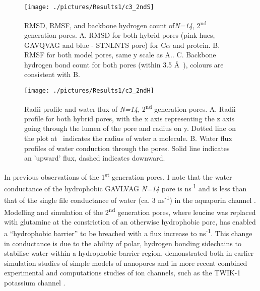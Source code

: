 \begin{figure}[H]
\begin{center}
\texttt{[image: ./pictures/Results1/c3\_2ndS]}
\caption[RMSD, RMSF, and backbone hydrogen count of\textit{N=14}, 2\textsuperscript{nd} generation pores.] {RMSD, RMSF, and backbone hydrogen count of\textit{N=14}, 2\textsuperscript{nd} generation pores. A. RMSD for both hybrid pores (pink hues, GAVQVAG and blue - STNLNTS pore) for C$\alpha$ and protein. B. RMSF for both model pores, same y scale as A.. C. Backbone hydrogen bond count for both pores (within 3.5 \AA\ ), colours are consistent with B.}
\label{fig:c3_2ndS}
\end{center}
\end{figure}

\begin{figure}[H]
\begin{center}
\texttt{[image: ./pictures/Results1/c3\_2ndH]}
\caption[Radii profile and water flux of \textit{N=14}, 2\textsuperscript{nd} generation pores.] {Radii profile and water flux of \textit{N=14}, 2\textsuperscript{nd} generation pores. A. Radii profile for both hybrid pores, with the x axis representing the z axis going through the lumen of the pore and radius on y. Dotted line on the plot at  \angstrom\ indicates the radius of water a molecule. B. Water flux profiles of water conduction through the pores. Solid line indicates an 'upward' flux, dashed indicates downward.}
\label{fig:c3_2ndH}
\end{center}
\end{figure}

In previous observations of the 1\textsuperscript{st} generation pores, I note that the water conductance of the hydrophobic GAVLVAG \textit{N=14} pore is  ns\textsuperscript{-1} and is less than that of the single file conductance of water (ca. 3 ns\textsuperscript{-1}) in the aquaporin channel \cite{Borgnia1999,Zhu2004}. Modelling and simulation of the 2\textsuperscript{nd} generation pores, where leucine was replaced with glutamine at the constriction of an otherwise hydrophobic pore, has enabled a ``hydrophobic barrier'' to be breached with a flux increase to  ns\textsuperscript{-1}. This change in conductance is due to the ability of polar, hydrogen bonding sidechains to stabilise water within a hydrophobic barrier region, demonstrated both in earlier simulation studies of simple models of nanopores \cite{Beckstein2001} and in more recent combined experimental and computations studies of ion channels, such as the TWIK-1 potassium channel \cite{Aryal2014g}.


